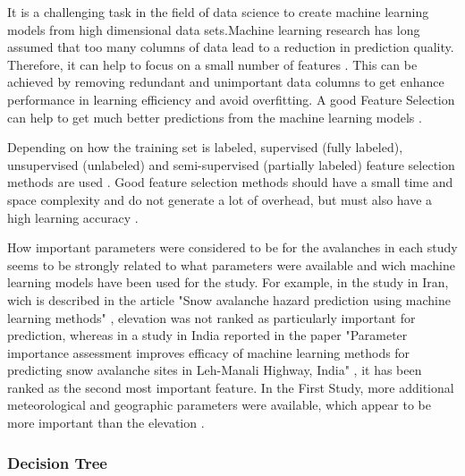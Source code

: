 \documentclass[12pt,a4paper]{article}
\begin{document}
It is a challenging task in the field of data science to create machine learning models from high dimensional data sets.Machine learning research has long assumed that too many columns of data lead to a reduction in prediction quality. Therefore, it can help to focus on a small number of features \autocites{CAI201870}. 
This can be achieved by removing redundant and unimportant data columns to get enhance performance in learning efficiency and avoid overfitting. A good Feature Selection can help to get much better predictions from the machine learning models \autocites{CAI201870}. 



Depending on how the training set is labeled, supervised (fully labeled), unsupervised (unlabeled) and semi-supervised (partially labeled) feature selection methods are used \autocites{CAI201870}.
Good feature selection methods should have a small time and space complexity and do not generate a lot of overhead, but must also have a high learning accuracy  \autocites{CAI201870}. 


How important parameters were considered to be for the avalanches in each study seems to be strongly related to what parameters were available and wich machine learning models have been used for the study. 
For example, in the study in Iran, wich is described in the article "Snow avalanche hazard prediction using machine learning methods" \autocite{Bahram:2019}, elevation was not ranked as particularly important for prediction, whereas in a study in India reported in the paper "Parameter importance assessment improves efficacy of machine learning methods for predicting snow avalanche sites in Leh-Manali Highway, India" \autocite[]{Tiwari:2021}, it has been ranked as the second most important feature. 
In the First Study, more additional meteorological and geographic parameters were available, which appear to be more important than the elevation \autocite{Bahram:2019} \autocite{Tiwari:2021}. 


\subsubsection{Decision Tree}
\end{document}
